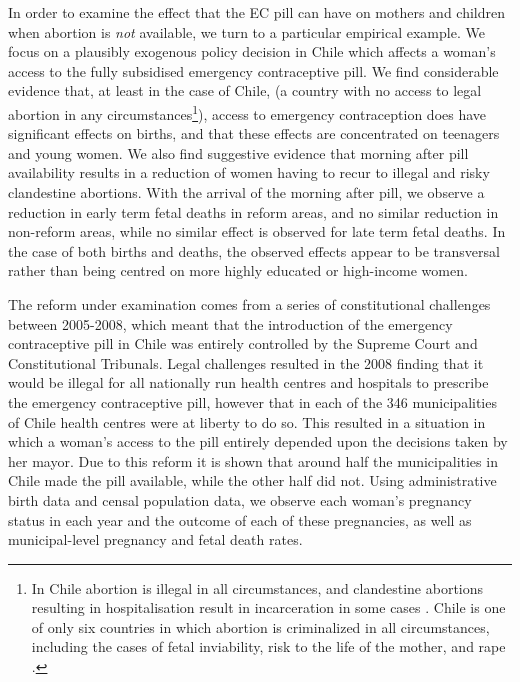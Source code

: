 In order to examine the effect that the EC pill can have on mothers and children 
when abortion is \emph{not} available, we turn to a particular empirical example.  
We focus on a plausibly exogenous policy decision in Chile which affects a 
woman's access to the fully subsidised emergency contraceptive pill.  We find 
considerable evidence that, at least in the case of Chile, (a country with no 
access to legal abortion in any circumstances\footnote{In Chile abortion is 
illegal in all circumstances, and clandestine abortions resulting in 
hospitalisation result in incarceration in some cases \citep{ShepardCasas2007}.  
Chile is one of only six countries in which abortion is criminalized in all 
circumstances, including the cases of fetal inviability, risk to the life of the 
mother, and rape \citep{UN2014}.}), access to emergency contraception does have 
significant effects on births, and that these effects are concentrated on 
teenagers and young women.  We also find suggestive evidence that morning after 
pill availability results in a reduction of women having to recur to illegal and 
risky clandestine abortions.  With the arrival of the morning after pill, we 
observe a reduction in early term fetal deaths in reform areas, and no similar 
reduction in non-reform areas, while no similar effect is observed for late term 
fetal deaths.  In the case of both births and deaths, the observed effects appear 
to be transversal rather than being centred on more highly educated or 
high-income women. 

The reform under examination comes from a series of constitutional challenges 
between 2005-2008, which meant that the introduction of the emergency contraceptive 
pill in Chile was entirely controlled by the Supreme Court and Constitutional 
Tribunals.  Legal challenges resulted in the 2008 finding that it would be illegal 
for all nationally run health centres and hospitals to prescribe the emergency 
contraceptive pill, however that in each of the 346 municipalities of Chile health 
centres were at liberty to do so.  This resulted  in a situation in which a woman's 
access to the pill entirely depended upon the decisions taken by her mayor.  Due 
to this reform it is shown that around half the municipalities in Chile made the 
pill available, while the other half did not.  Using administrative birth data and 
censal population data, we observe each woman's pregnancy status in each year and 
the outcome of each of these pregnancies, as well as municipal-level pregnancy and 
fetal death rates.

